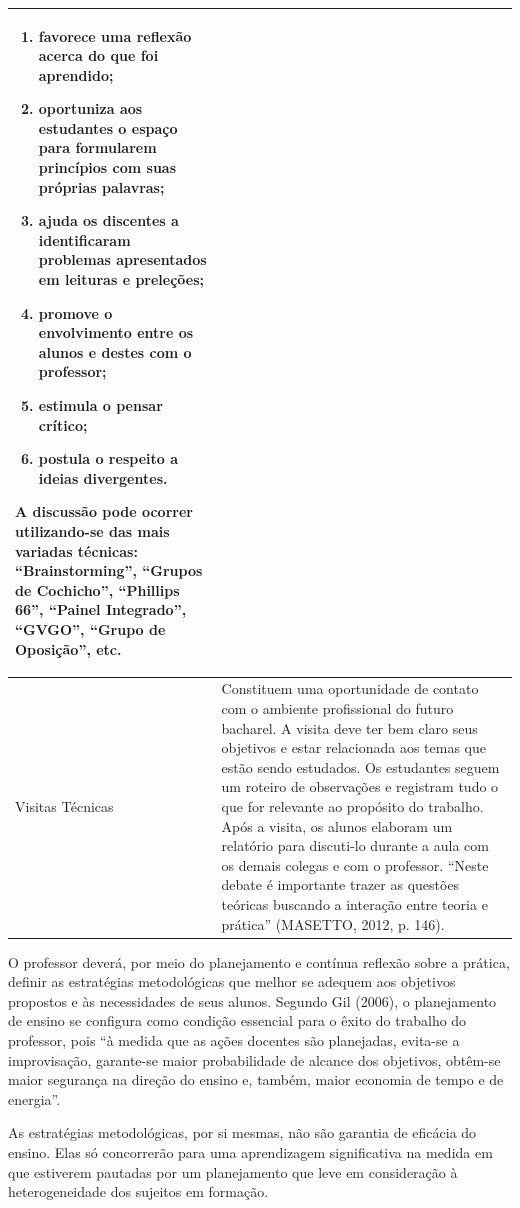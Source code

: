 \documentclass[
	12pt,				%
	openright,			%
  oneside,     %
	a4paper,			%
	chapter=TITLE,		%
	english,			%
	french,				%
	spanish,			%
	brazil				%
	]{abntex2}
\begin{document}
\begin{center}
\begin{scriptsize}
\begin{longtable}{p{4.5cm}p{10cm}}
        \begin{enumerate}[midsep]
            \item favorece uma reflexão acerca do que foi aprendido;
            \item oportuniza aos estudantes o espaço para formularem princípios com suas próprias palavras;
            \item ajuda os discentes a identificaram problemas apresentados em leituras e preleções;
            \item promove o envolvimento entre os alunos e destes com o professor;
            \item estimula o pensar crítico; 	
            \item postula o respeito a ideias divergentes.
        \end{enumerate}

        A discussão pode ocorrer utilizando-se das mais variadas técnicas: “Brainstorming”, “Grupos de Cochicho”, “Phillips 66”, “Painel Integrado”, “GVGO”, “Grupo de Oposição”, etc.\\ \midrule
        Visitas Técnicas & Constituem uma oportunidade de contato com o ambiente profissional do futuro bacharel. A visita deve ter bem claro seus objetivos e estar relacionada aos temas que estão sendo estudados. Os estudantes seguem um roteiro de observações e registram tudo o que for relevante ao propósito do trabalho. Após a visita, os alunos elaboram um relatório para discuti-lo durante a aula com os demais colegas e com o professor. “Neste debate é importante trazer as questões teóricas buscando a interação entre teoria e prática” (MASETTO, 2012, p. 146).\\
      \bottomrule
\end{longtable}
\end{scriptsize}      
\end{center}

O professor deverá, por meio do planejamento e contínua reflexão sobre a prática, definir as estratégias metodológicas que melhor se adequem aos objetivos propostos e às necessidades de seus alunos. Segundo Gil (2006), o planejamento de ensino se configura como condição essencial para o êxito do trabalho do professor, pois “à medida que as ações docentes são planejadas, evita-se a improvisação, garante-se maior probabilidade de alcance dos objetivos, obtêm-se maior segurança na direção do ensino e, também, maior economia de tempo e de energia”.
	
As estratégias metodológicas, por si mesmas, não são garantia de eficácia do ensino. Elas só concorrerão para uma aprendizagem significativa na medida em que estiverem pautadas por um planejamento que leve em consideração à heterogeneidade dos sujeitos em formação.
\end{document}
